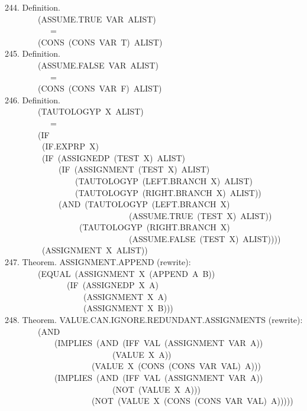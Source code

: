 \documentclass[10pt]{book}
\newenvironment{pubasis}{\begin{flushleft}}{\end{flushleft}}
\begin{document}
\begin{pubasis}
244.    Definition.\\
~~~~~~~~(ASSUME.TRUE~VAR~ALIST)\\
~~~~~~~~~~~=\\
~~~~~~~~(CONS~(CONS~VAR~T)~ALIST)\\

245.    Definition.\\
~~~~~~~~(ASSUME.FALSE~VAR~ALIST)\\
~~~~~~~~~~~=\\
~~~~~~~~(CONS~(CONS~VAR~F)~ALIST)\\

246.    Definition.\\
~~~~~~~~(TAUTOLOGYP~X~ALIST)\\
~~~~~~~~~~~=\\
~~~~~~~~(IF\\
~~~~~~~~~(IF.EXPRP~X)\\
~~~~~~~~~(IF~(ASSIGNEDP~(TEST~X)~ALIST)\\
~~~~~~~~~~~~~(IF~(ASSIGNMENT~(TEST~X)~ALIST)\\
~~~~~~~~~~~~~~~~~(TAUTOLOGYP~(LEFT.BRANCH~X)~ALIST)\\
~~~~~~~~~~~~~~~~~(TAUTOLOGYP~(RIGHT.BRANCH~X)~ALIST))\\
~~~~~~~~~~~~~(AND~(TAUTOLOGYP~(LEFT.BRANCH~X)\\
~~~~~~~~~~~~~~~~~~~~~~~~~~~~~~(ASSUME.TRUE~(TEST~X)~ALIST))\\
~~~~~~~~~~~~~~~~~~(TAUTOLOGYP~(RIGHT.BRANCH~X)\\
~~~~~~~~~~~~~~~~~~~~~~~~~~~~~~(ASSUME.FALSE~(TEST~X)~ALIST))))\\
~~~~~~~~~(ASSIGNMENT~X~ALIST))\\

247.    Theorem.  ASSIGNMENT.APPEND (rewrite):\\
~~~~~~~~(EQUAL~(ASSIGNMENT~X~(APPEND~A~B))\\
~~~~~~~~~~~~~~~(IF~(ASSIGNEDP~X~A)\\
~~~~~~~~~~~~~~~~~~~(ASSIGNMENT~X~A)\\
~~~~~~~~~~~~~~~~~~~(ASSIGNMENT~X~B)))\\

248.    Theorem.  VALUE.CAN.IGNORE.REDUNDANT.ASSIGNMENTS (rewrite):\\
~~~~~~~~(AND\\
~~~~~~~~~~~~(IMPLIES~(AND~(IFF~VAL~(ASSIGNMENT~VAR~A))\\
~~~~~~~~~~~~~~~~~~~~~~~~~~(VALUE~X~A))\\
~~~~~~~~~~~~~~~~~~~~~(VALUE~X~(CONS~(CONS~VAR~VAL)~A)))\\
~~~~~~~~~~~~(IMPLIES~(AND~(IFF~VAL~(ASSIGNMENT~VAR~A))\\
~~~~~~~~~~~~~~~~~~~~~~~~~~(NOT~(VALUE~X~A)))\\
~~~~~~~~~~~~~~~~~~~~~(NOT~(VALUE~X~(CONS~(CONS~VAR~VAL)~A)))))\\


\end{pubasis}
\end{document}
